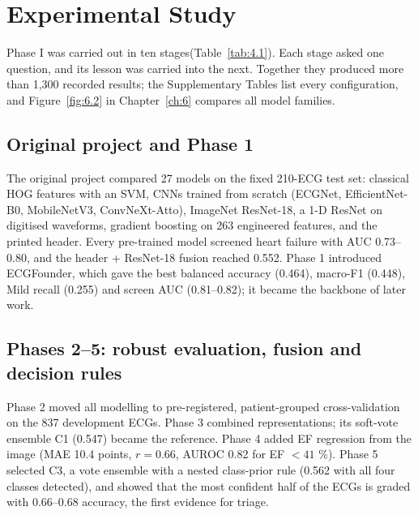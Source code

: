 \chapter{Experimental Study}\label{ch:4}



Phase I was carried out in ten stages(Table~\ref{tab:4.1}). Each stage asked one question, and its lesson was carried into the next. Together they produced more than 1,300 recorded results; the Supplementary Tables list every configuration, and Figure~\ref{fig:6.2} in Chapter~\ref{ch:6} compares all model families.

\section{Original project and Phase 1}\label{sec:4.1}





The original project compared 27 models on the fixed 210-ECG test set: classical HOG features with an SVM, CNNs trained from scratch (ECGNet, EfficientNet-B0, MobileNetV3, ConvNeXt-Atto), ImageNet ResNet-18, a 1-D ResNet on digitised waveforms, gradient boosting on 263 engineered features, and the printed header. Every pre-trained model screened heart failure with AUC 0.73--0.80, and the header + ResNet-18 fusion reached 0.552. Phase 1 introduced ECGFounder, which gave the best balanced accuracy (0.464), macro-F1 (0.448), Mild recall (0.255) and screen AUC (0.81--0.82); it became the backbone of later work.

\section{Phases 2--5: robust evaluation, fusion and decision rules}\label{sec:4.2}



Phase 2 moved all modelling to pre-registered, patient-grouped cross-validation on the 837 development ECGs. Phase 3 combined representations; its soft-vote ensemble C1 (0.547) became the reference. Phase 4 added EF regression from the image (MAE 10.4 points, $r=0.66$, AUROC 0.82 for EF $<41$ \%). Phase 5 selected C3, a vote ensemble with a nested class-prior rule (0.562 with all four classes detected), and showed that the most confident half of the ECGs is graded with 0.66--0.68 accuracy, the first evidence for triage.

